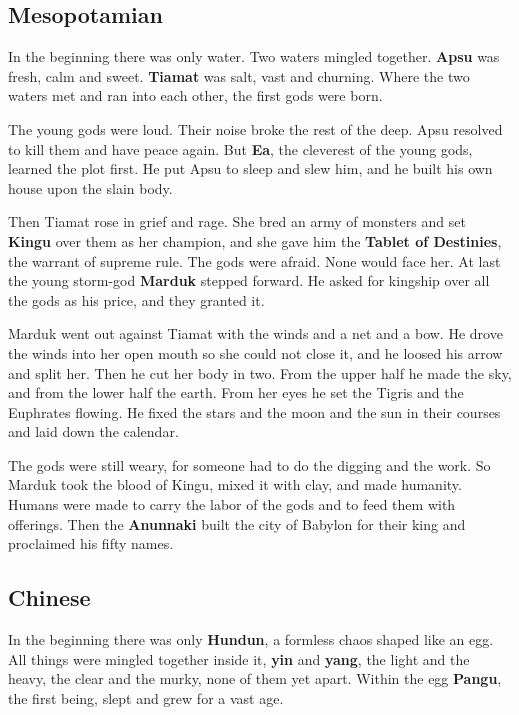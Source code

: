 \subsection{Mesopotamian}

In the beginning there was only water. Two waters mingled together.
\textbf{Apsu} was fresh, calm and sweet. \textbf{Tiamat} was salt, vast and
churning. Where the two waters met and ran into each other, the first gods were
born.

The young gods were loud. Their noise broke the rest of the deep. Apsu resolved
to kill them and have peace again. But \textbf{Ea}, the cleverest of the young
gods, learned the plot first. He put Apsu to sleep and slew him, and he built his
own house upon the slain body.

Then Tiamat rose in grief and rage. She bred an army of monsters and set
\textbf{Kingu} over them as her champion, and she gave him the \textbf{Tablet of
Destinies}, the warrant of supreme rule. The gods were afraid. None would face
her. At last the young storm-god \textbf{Marduk} stepped forward. He asked for
kingship over all the gods as his price, and they granted it.

Marduk went out against Tiamat with the winds and a net and a bow. He drove the
winds into her open mouth so she could not close it, and he loosed his arrow and
split her. Then he cut her body in two. From the upper half he made the sky, and
from the lower half the earth. From her eyes he set the Tigris and the Euphrates
flowing. He fixed the stars and the moon and the sun in their courses and laid
down the calendar.

The gods were still weary, for someone had to do the digging and the work. So
Marduk took the blood of Kingu, mixed it with clay, and made humanity. Humans
were made to carry the labor of the gods and to feed them with offerings. Then
the \textbf{Anunnaki} built the city of Babylon for their king and proclaimed his
fifty names.

\subsection{Chinese}

In the beginning there was only \textbf{Hundun}, a formless chaos shaped like an
egg. All things were mingled together inside it, \textbf{yin} and \textbf{yang},
the light and the heavy, the clear and the murky, none of them yet apart. Within
the egg \textbf{Pangu}, the first being, slept and grew for a vast age.

